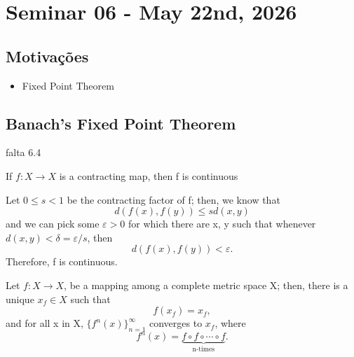 \documentclass[../fractals_everywhere.tex]{subfiles}
\begin{document}
\section{Seminar 06 - May 22nd, 2026}
\subsection{Motivações}
\begin{itemize}
	\item Fixed Point Theorem
\end{itemize}
\subsection{Banach's Fixed Point Theorem}
falta 6.4

\begin{lemma*}
	If \(f:X\rightarrow X\) is a contracting map, then f is continuous
\end{lemma*}
\begin{proof*}
	Let \(0\leq s <1\) be the contracting factor of f; then, we know that
	\[
		d(f(x), f(y))\leq sd(x, y)
	\]
	and we can pick some \(\varepsilon > 0\) for which there are x, y such that whenever \(d(x, y)<\delta = \varepsilon/s\), then
	\[
		d(f(x), f(y)) < \varepsilon .
	\]
	Therefore, f is continuous. \qedsymbol
\end{proof*}
\hypertarget{contracting_map}{\begin{theorem*}
		Let \(f:X\rightarrow X\), be a mapping among a complete metric space X; then, there is a unique \(x_{f}\in X\) such that
		\[
			f(x_{f})=x_{f},
		\]
		and for all x in X, \(\{f^{n}(x)\}_{n=1}^{\infty}\) converges to \(x_{f}\), where
		\[
			f^{n}(x) = \underbrace{f\circ f\circ\cdots\circ f}_{\text{n-times}}.
		\]
	\end{theorem*}}
\end{document}
